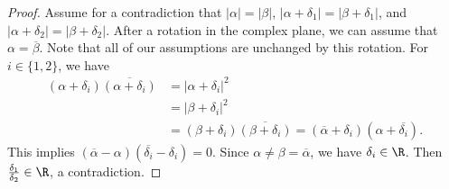 \documentclass[11pt]{article}
\begin{document}
\begin{proof}
 Assume for a contradiction that $|\alpha| = |\beta|$, $|\alpha + \delta_1| = |\beta + \delta_1|$, and $|\alpha + \delta_2| = |\beta + \delta_2|$.
 After a rotation in the complex plane,
 we can assume that $\alpha = \overline{\beta}$.
 Note that all of our assumptions are unchanged by this rotation.
 For $i \in \{1,2\}$,
 we have
 \begin{align*}
  (\alpha + \delta_i) \overline{(\alpha + \delta_i)}
  &= |\alpha + \delta_i|^2\\
  &= |\beta + \delta_i|^2\\
  &= (\beta + \delta_i) \overline{(\beta + \delta_i)}
  = (\overline{\alpha} + \delta_i) (\alpha + \overline{\delta_i}).
 \end{align*}
 This implies $(\overline{\alpha} - \alpha) (\overline{\delta_i} - \delta_i) = 0$.
 Since $\alpha \ne \beta = \overline{\alpha}$,
 we have $\delta_i \in \R$.
 Then $\frac{\delta_1}{\delta_2} \in \R$, a contradiction.
\end{proof}
\end{document}
